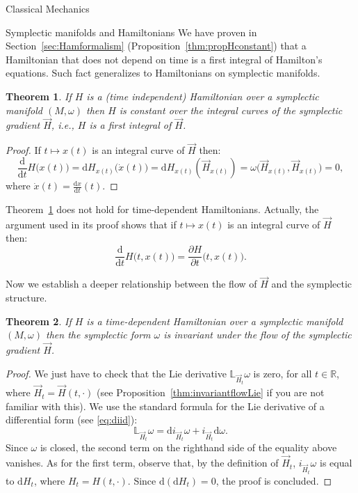 \documentclass[oneside,a4paper,11pt]{amsbook}
\newcommand{\R}{\mathds R}
\newcommand{\dd}{\mathrm d}
\theoremstyle{remark}\newtheorem{exercise}{Exercise}[chapter]
\theoremstyle{plain}\newtheorem{teo}{Theorem}[section]
\theoremstyle{plain}\newtheorem{lem}[teo]{Lemma}
\theoremstyle{plain}\newtheorem{prop}[teo]{Proposition}
\theoremstyle{plain}\newtheorem{cor}[teo]{Corollary}
\theoremstyle{definition}\newtheorem{defin}[teo]{Definition}
\theoremstyle{remark}\newtheorem{rem}[teo]{Remark}
\theoremstyle{definition}\newtheorem{notation}[teo]{Notation}
\theoremstyle{definition}\newtheorem{convention}[teo]{Convention}
\theoremstyle{definition}\newtheorem{example}[teo]{Example}
\numberwithin{section}{chapter}
\numberwithin{equation}{section}
\begin{document}
\begin{chapter}{Classical Mechanics}
\begin{section}{Symplectic manifolds and Hamiltonians}
We have proven in Section~\ref{sec:Hamformalism} (Proposition~\ref{thm:propHconstant}) that a Hamiltonian that does not depend on time is a first integral of Hamilton's
equations. Such fact generalizes to Hamiltonians on symplectic manifolds.
\begin{teo}\label{thm:Hfirstint}
If $H$ is a (time {\em independent})
Hamiltonian over a symplectic manifold $(M,\omega)$ then $H$ is constant over the integral
curves of the symplectic gradient $\vec H$, i.e., $H$ is a first integral of $\vec H$.
\end{teo}
\begin{proof}
If $t\mapsto x(t)$ is an integral curve of $\vec H$ then:
\[\frac{\dd}{\dd t}H\big(x(t)\big)=\dd H_{x(t)}\big(\dot x(t)\big)=\dd H_{x(t)}(\vec H_{x(t)})=\omega\big(\vec H_{x(t)},\vec H_{x(t)})=0,\]
where $\dot x(t)=\frac{\dd x}{\dd t}(t)$.
\end{proof}
Theorem~\ref{thm:Hfirstint} does not hold for time-dependent Hamiltonians. Actually, the argument used in its proof shows that if $t\mapsto x(t)$ is an
integral curve of $\vec H$ then:
\[\frac{\dd}{\dd t}H\big(t,x(t)\big)=\frac{\partial H}{\partial t}\big(t,x(t)\big).\]

Now we establish a deeper relationship between the flow of $\vec H$ and the symplectic structure.
\begin{teo}
If $H$ is a time-dependent Hamiltonian over a symplectic manifold $(M,\omega)$ then the symplectic form $\omega$ is invariant
under the flow of the symplectic gradient $\vec H$.
\end{teo}
\begin{proof}
We just have to check that the Lie derivative $\mathbb L_{\vec H_t}\omega$ is zero, for all $t\in\R$, where $\vec H_t=\vec H(t,\cdot)$
(see Proposition~\ref{thm:invariantflowLie} if you are not familiar with this). We use the standard formula for the Lie derivative of a differential
form (see \eqref{eq:diid}):
\[\mathbb L_{\vec H_t}\omega=\dd i_{\vec H_t}\omega+i_{\vec H_t}\dd\omega.\]
Since $\omega$ is closed, the second term on the righthand side of the equality above vanishes. As for the first term,
observe that, by the definition of $\vec H_t$, $i_{\vec H_t}\omega$ is equal to $\dd H_t$, where $H_t=H(t,\cdot)$.
Since $\dd(\dd H_t)=0$, the proof is concluded.
\end{proof}


\end{section}
\end{chapter}
\end{document}
